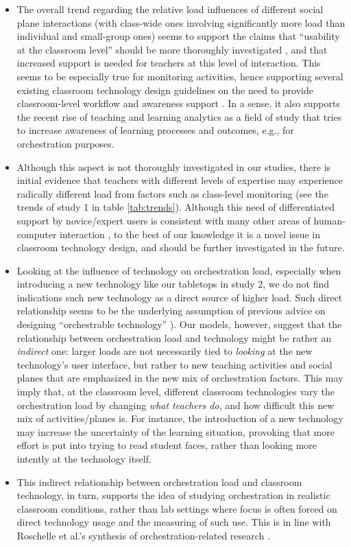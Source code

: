\documentclass[10pt,journal,compsoc]{IEEEtran}
\begin{document}
\begin{itemize}
\item The overall trend regarding the relative load influences of different social plane interactions (with class-wide ones involving significantly more load than individual and small-group ones) seems to support the claims that ``usability at the classroom level'' should be more thoroughly investigated \cite{Dillenbourg2011}, and that increased support is needed for teachers at this level of interaction. This seems to be especially true for monitoring activities, hence supporting several existing classroom technology design guidelines on the need to provide classroom-level workflow and awareness support \cite{Kharrufa2013,Kreitmayer2013,Dillenbourg2013}. In a sense, it also supports the recent rise of teaching and learning analytics as a field of study that tries to increase awareness of learning processes and outcomes, e.g., for orchestration purposes.
\item Although this aspect is not thoroughly investigated in our studies, there is initial evidence that teachers with different levels of expertise may experience radically different load from factors such as class-level monitoring (see the trends of study 1 in table \ref{tab:trends}). Although this need of differentiated support by novice/expert users is consistent with many other areas of human-computer interaction \cite{ziefle2002influence}, to the best of our knowledge it is a novel issue in classroom technology design, and should be further investigated in the future.
\item Looking at the influence of technology on orchestration load, especially when introducing a new technology like our tabletops in study 2, we do not find indications such new technology as a direct source of higher load. Such direct relationship seems to be the underlying assumption of previous advice on designing ``orchestrable technology'' \cite{Cuendet2013}). Our models, however, suggest that the relationship between orchestration load and technology might be rather an \textit{indirect} one: larger loads are not necessarily tied to \textit{looking} at the new technology's user interface, but rather to new teaching activities and social planes that are emphasized in the new mix of orchestration factors. This may imply that, at the classroom level, different classroom technologies vary the orchestration load by changing \textit{what teachers do}, and how difficult this new mix of activities/planes is. For instance, the introduction of a new technology may increase the uncertainty of the learning situation, provoking that more effort is put into trying to read student faces, rather than looking more intently at the technology itself.
\item This indirect relationship between orchestration load and classroom technology, in turn, supports the idea of studying orchestration in realistic classroom conditions, rather than lab settings where focus is often forced on direct technology usage and the measuring of such use. This is in line with Roschelle et al.'s synthesis of orchestration-related research \cite{Roschelle2013}.
\end{itemize}
\end{document}
